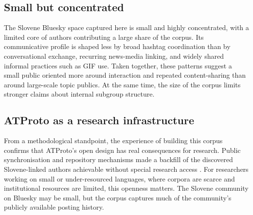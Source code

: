 \subsection{Small but concentrated}

The Slovene Bluesky space captured here is small and highly concentrated, with a limited core of authors contributing a large share of the corpus. Its communicative profile is shaped less by broad hashtag coordination than by conversational exchange, recurring news-media linking, and widely shared informal practices such as GIF use. Taken together, these patterns suggest a small public oriented more around interaction and repeated content-sharing than around large-scale topic publics. At the same time, the size of the corpus limits stronger claims about internal subgroup structure.

\subsection{ATProto as a research infrastructure}

From a methodological standpoint, the experience of building this corpus confirms that ATProto’s open design has real consequences for research. Public synchronisation and repository mechanisms made a backfill of the discovered Slovene-linked authors achievable without special research access \parencite{atproto-sync,atproto-streaming}. For researchers working on small or under-resourced languages, where corpora are scarce and institutional resources are limited, this openness matters. The Slovene community on Bluesky may be small, but the corpus captures much of the community’s publicly available posting history.
